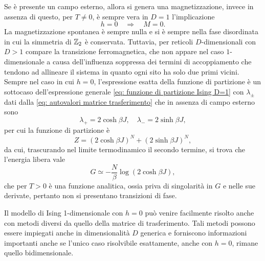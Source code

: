 Se è presente un campo esterno, allora si genera una magnetizzazione, invece in assenza di questo, per $T \neq 0$, è sempre vera in $D = 1$ l'implicazione 
\begin{equation}
    h = 0\quad\Longrightarrow\quad M = 0.
\end{equation}
La magnetizzazione spontanea è sempre nulla e si è sempre nella fase disordinata in cui la simmetria di $\mathbb{Z}_2$ è conservata. Tuttavia, per reticoli $D$-dimensionali con $D > 1$ compare la transizione ferromagnetica, che non appare nel caso $1$-dimensionale a causa dell'influenza soppressa dei termini di accoppiamento che tendono ad allineare il sistema in quanto ogni sito ha solo due primi vicini. Sempre nel caso in cui $h = 0$, l'espressione esatta della funzione di partizione è un sottocaso dell'espressione generale \eqref{eq: funzione di partizione Ising D=1} con $\lambda_\pm$ dati dalla \eqref{eq: autovalori matrice trasferimento} che in assenza di campo esterno sono
\begin{equation}
    \lambda_+ = 2\cosh{\beta J},\quad \lambda_- = 2\sinh{\beta J},
\end{equation}
per cui la funzione di partizione è
\begin{equation}
    Z = (2\cosh{\beta J})^N + (2\sinh{\beta J})^N,
\end{equation}
da cui, trascurando nel limite termodinamico il secondo termine, si trova che l'energia libera vale
\begin{equation}
    G \simeq -\frac{N}{\beta}\log{(2\cosh{\beta J})},
\end{equation}
che per $T > 0$ è una funzione analitica, ossia priva di singolarità in $G$ e nelle sue derivate, pertanto non si presentano transizioni di fase. 
\begin{obs}
    Il modello di Ising 1-dimensionale con $h = 0$ può venire facilmente risolto anche con metodi diversi da quello della matrice di trasferimento. Tali metodi possono essere impiegati anche in dimensionalità $D$ generica e forniscono informazioni importanti anche se l'unico caso risolvibile esattamente, anche con $h = 0$, rimane quello bidimensionale.
\end{obs}

